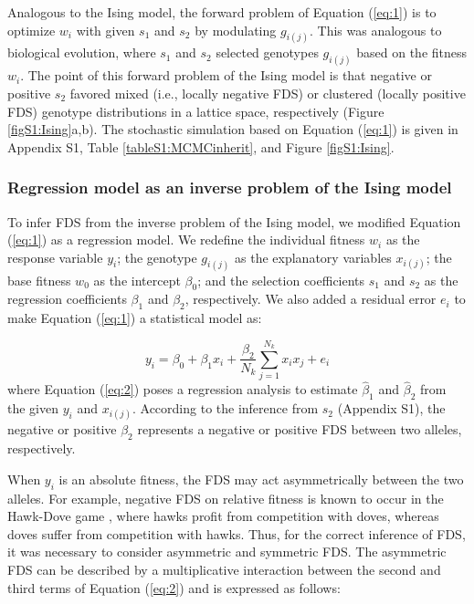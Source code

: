 \documentclass[12pt,]{article}
\begin{document}
Analogous to the Ising model, the forward problem of Equation (\ref{eq:1}) is to optimize $w_i$ with given $s_1$ and $s_2$ by modulating $g_{i(j)}$. This was analogous to biological evolution, where $s_1$ and $s_2$ selected genotypes $g_{i(j)}$ based on the fitness $w_i$. The point of this forward problem of the Ising model is that negative or positive $s_2$ favored mixed (i.e., locally negative FDS) or clustered (locally positive FDS) genotype distributions in a lattice space, respectively (Figure \ref{figS1:Ising}a,b). The stochastic simulation based on Equation (\ref{eq:1}) is given in Appendix S1, Table \ref{tableS1:MCMCinherit}, and Figure \ref{figS1:Ising}.


\subsubsection{Regression model as an inverse problem of the Ising model}

To infer FDS from the inverse problem of the Ising model, we modified Equation (\ref{eq:1}) as a regression model. We redefine the individual fitness $w_i$ as the response variable $y_i$; the genotype $g_{i(j)}$ as the explanatory variables $x_{i(j)}$; the base fitness $w_0$ as the intercept $\beta_0$; and the selection coefficients $s_1$ and $s_2$ as the regression coefficients $\beta_1$ and $\beta_2$, respectively. We also added a residual error $e_i$ to make Equation (\ref{eq:1}) a statistical model as: 

\begin{equation}
y_i = \beta_0 + \beta_1x_i + \frac{\beta_2}{N_k}\sum^{N_{k}}_{j=1}{x_ix_j} + e_i \label{eq:2}
\end{equation}
\noindent
where Equation (\ref{eq:2}) poses a regression analysis to estimate $\hat{\beta}_1$ and $\hat{\beta}_2$ from the given $y_i$ and $x_{i(j)}$. According to the inference from $s_2$ (Appendix S1), the negative or positive $\beta_2$ represents a negative or positive FDS between two alleles, respectively. 

When $y_i$ is an absolute fitness, the FDS may act asymmetrically between the two alleles. For example, negative FDS on relative fitness is known to occur in the Hawk-Dove game \citep{takahashi2018balanced}, where hawks profit from competition with doves, whereas doves suffer from competition with hawks. Thus, for the correct inference of FDS, it was necessary to consider asymmetric and symmetric FDS. The asymmetric FDS can be described by a multiplicative interaction between the second and third terms of Equation (\ref{eq:2}) \citep{sato2019neighbor} and is expressed as follows:
\end{document}
